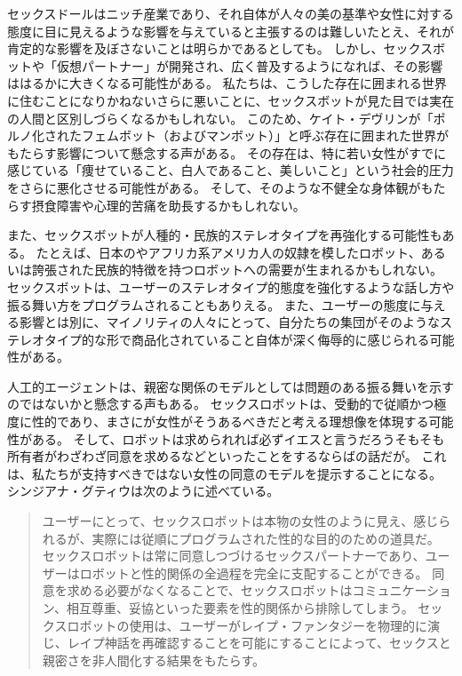 \documentclass[paper=a4,book,openany]{jlreq} \usepackage{mystyle}
\begin{document}
セックスドールはニッチ産業であり、それ自体が人々の美の基準や女性に対する態度に目に見えるような影響を与えていると主張するのは難しい{\DDASH}たとえ、それが肯定的な影響を及ぼさないことは明らかであるとしても。
しかし、セックスボットや「仮想パートナー」が開発され、広く普及するようになれば、その影響ははるかに大きくなる可能性がある。
私たちは、こうした存在に囲まれる世界に住むことになりかねない{\DDASH}さらに悪いことに、セックスボットが見た目では実在の人間と区別しづらくなるかもしれない。
このため、ケイト・デヴリンが「ポルノ化されたフェムボット（およびマンボット）」と呼ぶ存在に囲まれた世界がもたらす影響について懸念する声がある\citep[cf.][]{devlin19:_turned}。
その存在は、特に若い女性がすでに感じている「痩せていること、白人であること、美しいこと」という社会的圧力をさらに悪化させる可能性がある。
そして、そのような不健全な身体観がもたらす摂食障害や心理的苦痛を助長するかもしれない。

また、セックスボットが人種的・民族的ステレオタイプを再強化する可能性もある。
たとえば、日本のやアフリカ系アメリカ人の奴隷を模したロボット、あるいは誇張された民族的特徴を持つロボットへの需要が生まれるかもしれない。
セックスボットは、ユーザーのステレオタイプ的態度を強化するような話し方や振る舞い方をプログラムされることもありえる。
また、ユーザーの態度に与える影響とは別に、マイノリティの人々にとって、自分たちの集団がそのようなステレオタイプ的な形で商品化されていること自体が深く侮辱的に感じられる可能性がある。

人工的エージェントは、親密な関係のモデルとしては問題のある振る舞いを示すのではないかと懸念する声もある。
セックスロボットは、受動的で従順かつ極度に性的であり、まさにが女性がそうあるべきだと考える理想像を体現する可能性がある。
そして、ロボットは求められれば必ずイエスと言うだろう{\DDASH}そもそも所有者がわざわざ同意を求めるなどといったことをするならばの話だが。
これは、私たちが支持すべきではない女性の同意のモデルを提示することになる。
シンジアナ・グティウは次のように述べている。

\begin{quote}
 ユーザーにとって、セックスロボットは本物の女性のように見え、感じられるが、実際には従順にプログラムされた性的な目的のための道具だ。
セックスロボットは常に同意しつづけるセックスパートナーであり、ユーザーはロボットと性的関係の全過程を完全に支配することができる。
同意を求める必要がなくなることで、セックスロボットはコミュニケーション、相互尊重、妥協といった要素を性的関係から排除してしまう。
セックスロボットの使用は、ユーザーがレイプ・ファンタジーを物理的に演じ、レイプ神話を再確認することを可能にすることによって、セックスと親密さを非人間化する結果をもたらす。
\citep[p.187]{gutiu16:_robot_consen}
\end{quote}
\end{document}
